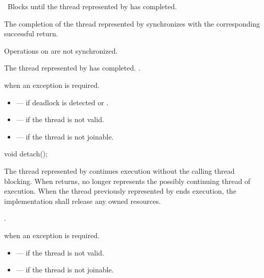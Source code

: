 \begin{itemdescr}
\pnum
\effects\ Blocks until the thread represented by  has completed.

\pnum
\sync The completion of the thread represented by  synchronizes with
the corresponding successful
 return. \begin{note} Operations on
 are not synchronized. \end{note}

\pnum
\ensures The thread represented by  has completed. .

\pnum
\throws {} when
an exception is required.

\pnum
\errors
\begin{itemize}
\item {} --- if deadlock is detected or
.

\item {} --- if the thread is not valid.

\item {} --- if the thread is not joinable.
\end{itemize}
\end{itemdescr}

%
\begin{itemdecl}
void detach();
\end{itemdecl}

\begin{itemdescr}
\pnum
\effects The thread represented by  continues execution without the calling thread
blocking. When  returns,  no longer represents the possibly continuing
thread of execution. When the thread previously represented by  ends execution, the
implementation shall release any owned resources.

\pnum\ensures {}.

\pnum\throws {} when
an exception is required.

\pnum \errors
\begin{itemize}
\item {} --- if the thread is not valid.
\item {} --- if the thread is not joinable.
\end{itemize}
\end{itemdescr}


